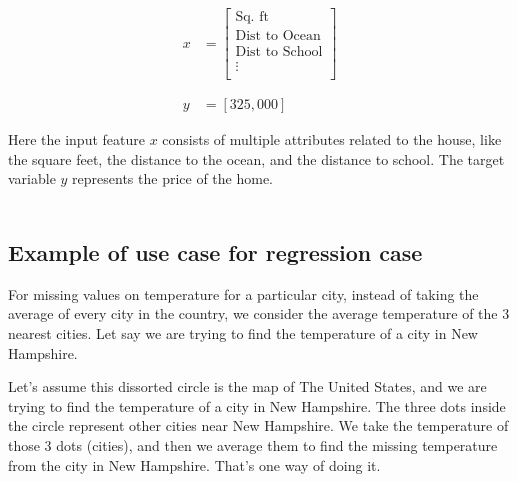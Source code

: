 \vspace{-0.5cm}

\begin{align*}
    x &= \begin{bmatrix}
            \text{Sq. ft} \\
            \text{Dist to Ocean} \\
            \text{Dist to School} \\
            \vdots \\
         \end{bmatrix} \\\\\\
    y &= [325,000]
\end{align*}

Here the input feature $x$ consists of multiple attributes related to the house,
like the  square feet, the distance to the ocean, and the distance to school. The target
variable $y$ represents the price of the home.\\\\

\subsection{Example of use case for regression case}

For missing values on temperature for a particular city, instead of
taking the average of every city in the country, we consider the average
temperature of the 3 nearest cities. Let say we are trying to find the temperature
of a city in New Hampshire.

\begin{center}
\end{center}

Let's assume this dissorted circle is the map of The United States, and we are trying
to find the temperature of a city in New Hampshire. The three dots inside the circle
represent other cities near New Hampshire. We take the temperature of those 3 dots (cities),
and then we average them to find the missing temperature from the city in New Hampshire. That's one
way of doing it.

